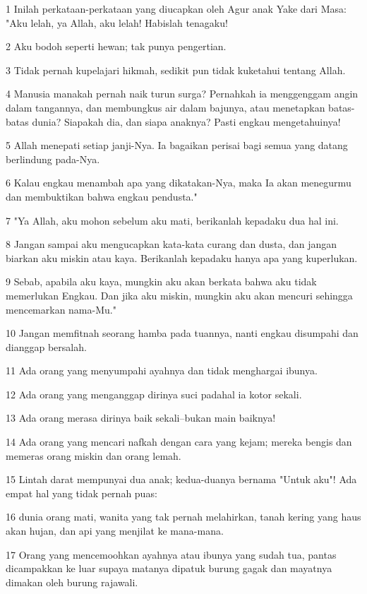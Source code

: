 \par 1 Inilah perkataan-perkataan yang diucapkan oleh Agur anak Yake dari Masa: "Aku lelah, ya Allah, aku lelah! Habislah tenagaku!
\par 2 Aku bodoh seperti hewan; tak punya pengertian.
\par 3 Tidak pernah kupelajari hikmah, sedikit pun tidak kuketahui tentang Allah.
\par 4 Manusia manakah pernah naik turun surga? Pernahkah ia menggenggam angin dalam tangannya, dan membungkus air dalam bajunya, atau menetapkan batas-batas dunia? Siapakah dia, dan siapa anaknya? Pasti engkau mengetahuinya!
\par 5 Allah menepati setiap janji-Nya. Ia bagaikan perisai bagi semua yang datang berlindung pada-Nya.
\par 6 Kalau engkau menambah apa yang dikatakan-Nya, maka Ia akan menegurmu dan membuktikan bahwa engkau pendusta."
\par 7 "Ya Allah, aku mohon sebelum aku mati, berikanlah kepadaku dua hal ini.
\par 8 Jangan sampai aku mengucapkan kata-kata curang dan dusta, dan jangan biarkan aku miskin atau kaya. Berikanlah kepadaku hanya apa yang kuperlukan.
\par 9 Sebab, apabila aku kaya, mungkin aku akan berkata bahwa aku tidak memerlukan Engkau. Dan jika aku miskin, mungkin aku akan mencuri sehingga mencemarkan nama-Mu."
\par 10 Jangan memfitnah seorang hamba pada tuannya, nanti engkau disumpahi dan dianggap bersalah.
\par 11 Ada orang yang menyumpahi ayahnya dan tidak menghargai ibunya.
\par 12 Ada orang yang menganggap dirinya suci padahal ia kotor sekali.
\par 13 Ada orang merasa dirinya baik sekali--bukan main baiknya!
\par 14 Ada orang yang mencari nafkah dengan cara yang kejam; mereka bengis dan memeras orang miskin dan orang lemah.
\par 15 Lintah darat mempunyai dua anak; kedua-duanya bernama "Untuk aku"! Ada empat hal yang tidak pernah puas:
\par 16 dunia orang mati, wanita yang tak pernah melahirkan, tanah kering yang haus akan hujan, dan api yang menjilat ke mana-mana.
\par 17 Orang yang mencemoohkan ayahnya atau ibunya yang sudah tua, pantas dicampakkan ke luar supaya matanya dipatuk burung gagak dan mayatnya dimakan oleh burung rajawali.
